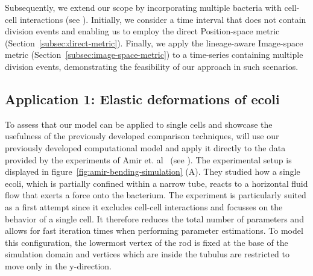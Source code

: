 Subsequently, we extend our scope by incorporating multiple bacteria with cell-cell interactions
(see ).
Initially, we consider a time interval that does not contain division events and enabling us to
employ the direct Position-space metric (Section~\ref{subsec:direct-metric}).
Finally, we apply the lineage-aware Image-space metric (Section~\ref{subsec:image-space-metric})
to a time-series containing multiple division events, demonstrating the feasibility
of our approach
in such scenarios.

\subsection{Application 1: Elastic deformations of \acl{ecoli}}
\label{sec:application-1-amir}

To assess that our model can be applied to single cells and showcase the usefulness of the
previously developed comparison techniques,
will use our previously developed computational model and apply it directly to the data provided
by the experiments of Amir et. al~\cite{Amir2014,Amir2014_2} (see
).
The experimental setup is displayed in figure~\ref{fig:amir-bending-simulation} (A).
They studied how a single \ac{ecoli}, which is partially confined within a narrow tube, reacts
to a horizontal fluid flow that exerts a force onto the bacterium.
The experiment is particularly suited as a first attempt since it excludes cell-cell
interactions
and focusses on the behavior of a single cell.
It therefore reduces the total number of parameters and allows for fast iteration times when
performing parameter estimations.
To model this configuration, the lowermost vertex of the rod is fixed at the base of
the simulation
domain and vertices which are inside the tubulus are restricted to move only in the y-direction.

